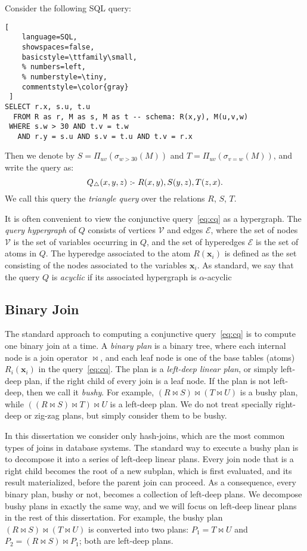 \begin{ex} \label{ex:triangle} Consider the following SQL query:
\begin{lstlisting}[
    language=SQL,
    showspaces=false,
    basicstyle=\ttfamily\small,
    % numbers=left,
    % numberstyle=\tiny,
    commentstyle=\color{gray}
 ]
SELECT r.x, s.u, t.u
  FROM R as r, M as s, M as t -- schema: R(x,y), M(u,v,w)
 WHERE s.w > 30 AND t.v = t.w
   AND r.y = s.u AND s.v = t.u AND t.v = r.x
\end{lstlisting}
%
Then we denote by $S = \Pi_{uv}(\sigma_{w>30}(M))$ and $T =
\Pi_{uv}(\sigma_{v=w}(M))$, and write the query as:
$$Q_{\triangle}(x,y,z) \text{ :- } R(x, y), S(y,z), T(z, x).$$
%
We call this query the \emph{triangle query} over the relations $R$, $S$,
$T$.
\end{ex}

It is often convenient to view the conjunctive query~\eqref{eq:cq} as
a hypergraph.  The \emph{query hypergraph} of $Q$ consists of vertices
$\mathcal{V}$ and edges $\mathcal{E}$, where the set of nodes
$\mathcal{V}$ is the set of variables occurring in $Q$, and the set of
hyperedges $\mathcal{E}$ is the set of atoms in $Q$.  The hyperedge
associated to the atom $R(\bm x_i)$ is defined as the set consisting
of the nodes associated to the variables $\bm x_i$.  As standard, we
say that the query $Q$ is {\em acyclic} if its associated hypergraph
is $\alpha$-acyclic~\cite{DBLP:journals/jacm/Fagin83}


\subsection{Binary Join}\label{sec:binary-join}

The standard approach to computing a conjunctive query~\eqref{eq:cq} is
to compute one binary join at a time.  A {\em binary plan} is a binary
tree, where each internal node is a join operator $\Join$, and each
leaf node is one of the base tables (atoms) $R_i(\bm x_i)$ in the
query~\eqref{eq:cq}.  The plan is a \emph{left-deep linear plan}, or
simply left-deep plan, if the right child of every join is a leaf
node.  If the plan is not left-deep, then we call it \emph{bushy}.
For example, $(R \Join S) \Join (T \Join U)$ is a bushy plan, while
$((R \Join S) \Join T) \Join U$ is a left-deep plan.  We do not treat
specially right-deep or zig-zag plans, but simply consider them to be
bushy.

In this dissertation we consider only hash-joins, which are the most
common types of joins in database systems. 
The standard way to execute a bushy plan is to
decompose it into a series of left-deep linear plans.  Every join node
that is a right child becomes the root of a new subplan, which is
first evaluated, and its result materialized, before the parent join
can proceed.  As a consequence, every binary plan, bushy or not,
becomes a collection of left-deep plans. We decompose bushy
plans in exactly the same way, and we will focus on left-deep linear
plans in the rest of this dissertation.  For example, the bushy plan
$(R \Join S) \Join (T \Join U)$ is converted into two plans:
$P_1 = T \Join U$ and $P_2 = (R \Join S) \Join P_1$; both are
left-deep plans.

